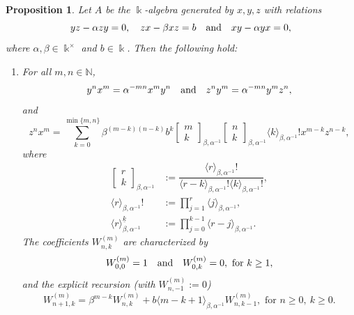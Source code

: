 \documentclass{amsart}
\newtheorem{proposition}[theorem]{Proposition}
\theoremstyle{definition}
\theoremstyle{remark}
\numberwithin{equation}{section}
\begin{document}
\begin{proposition}\label{case(3)(ii)}
Let $A$ be the $\Bbbk$-algebra generated by $x,y,z$ with relations
\[
yz - \alpha zy = 0, \quad zx - \beta xz = b \quad {\rm and} \quad xy - \alpha yx = 0,
\]    
where $\alpha,\beta\in\Bbbk^{\times}$ and $b\in\Bbbk$. Then the following hold:

\begin{enumerate}
\item[\rm (1)] For all $m,n\in\mathbb{N}$,
\[
y^n x^m=\alpha^{-mn}x^m y^n \quad {\rm and} \quad z^n y^m=\alpha^{-mn}y^m z^n, 
\]
and
\begin{equation}\label{znxmclosedcase3ii}
z^n x^m=\sum_{k=0}^{\min\{m,n\}}\beta^{(m-k)(n-k)}b^k
\begin{bmatrix} m\\ k\end{bmatrix}_{\beta,\alpha^{-1}}\begin{bmatrix} n\\ k\end{bmatrix}_{\beta,\alpha^{-1}}\langle k\rangle_{\beta,\alpha^{-1}}!x^{m-k}z^{n-k},
\end{equation}
where 
\begin{align*}
\begin{bmatrix} r\\ k\end{bmatrix}_{\beta,\alpha^{-1}} &:=\dfrac{\langle r\rangle_{\beta,\alpha^{-1}}!}{\langle r-k\rangle_{\beta,\alpha^{-1}}!\langle k\rangle_{\beta,\alpha^{-1}}!}, \\
\langle r\rangle_{\beta,\alpha^{-1}}! &:={\displaystyle\prod_{j=1}^{r}\langle j\rangle_{\beta,\alpha^{-1}}}, \\
\langle r\rangle^{\underline{k}}_{\beta,\alpha^{-1}} &:=\displaystyle\prod_{j=0}^{k-1}\langle r-j\rangle _{\beta,\alpha^{-1}}.
\end{align*}
The coefficients $W^{(m)}_{n,k}$ are characterized by
\begin{equation}\label{Wdefcase3ii}
W^{(m)}_{0,0}=1 \quad {\rm and} \quad W^{(m)}_{0,k}=0, \text{ for } k\ge 1,
\end{equation}
and the explicit recursion (with $W^{(m)}_{n,-1}:=0$)
\begin{equation}\label{Wreccase3ii}
W^{(m)}_{n+1,k}=\beta^{m-k}W^{(m)}_{n,k} +b\langle m-k+1\rangle_{\beta,\alpha^{-1}}W^{(m)}_{n,k-1}, \text{ for } n\ge 0,\ k\ge 0.
\end{equation}


\end{enumerate}
\end{proposition}
\end{document}
